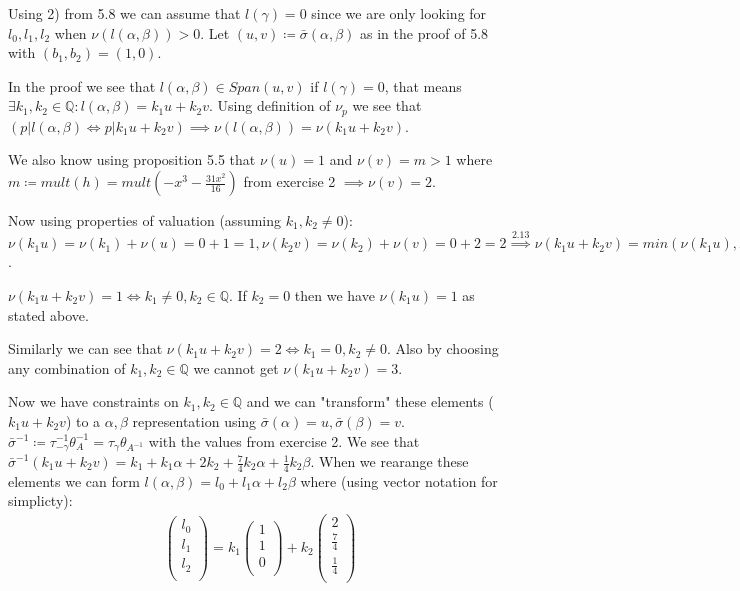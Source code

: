 \documentclass[12pt, a4paper]{article}
\begin{document}
Using 2) from 5.8 we can assume that $l(\gamma)=0$ since we are only looking for $l_0,l_1,l_2$ when $\nu(l(\alpha,\beta))>0$. Let $(u,v) \coloneqq \bar{\sigma}(\alpha,\beta)$ as in the proof of 5.8 with $(b_1,b_2) = (1,0)$. 

In the proof we see that $l(\alpha,\beta) \in Span(u,v)$ if $l(\gamma)=0$, that means $\exists k_1,k_2 \in \mathbb{Q}: l(\alpha, \beta) = k_1u + k_2v$. Using definition of $\nu_p$ we see that $(p | l(\alpha,\beta) \iff p| k_1u+k_2v) \implies \nu(l(\alpha, \beta))=\nu(k_1u+k_2v)$. 

We also know using proposition 5.5 that $\nu(u)=1$ and $\nu(v)=m>1$ where $m \coloneqq mult(h) = mult(-x^3-\frac{31 x^2}{16})$ from exercise 2 $\implies \nu(v)=2$.

Now using properties of valuation (assuming $k_1,k_2 \neq 0$): $\nu(k_1u)=\nu(k_1)+\nu(u) = 0 + 1 = 1, \nu(k_2v)=\nu(k_2)+\nu(v) = 0 + 2 = 2 \stackrel{2.13}{\implies} \nu(k_1u+k_2v) = min(\nu(k_1u),\nu(k_2v)) = min(1,2) = 1$.

$\nu(k_1u+k_2v) = 1 \iff k_1 \neq 0, k_2 \in \mathbb{Q}$. If $k_2=0$ then we have $\nu(k_1u)=1$ as stated above.

Similarly we can see that $\nu(k_1u+k_2v) = 2 \iff k_1 = 0, k_2 \neq 0$. Also by choosing any combination of $k_1,k_2 \in \mathbb{Q}$ we cannot get $\nu(k_1u+k_2v) = 3$.

Now we have constraints on $k_1,k_2 \in \mathbb{Q}$ and we can "transform" these elements ($k_1u+k_2v$) to a $\alpha, \beta$ representation using $\bar{\sigma}(\alpha)=u, \bar{\sigma}(\beta)=v$. $\bar{\sigma}^{-1} \coloneqq \tau^{-1}_{-\gamma} \theta^{-1}_{A} = \tau_{\gamma}\theta_{A^{-1}}$ with the values from exercise 2. We see that $\bar{\sigma}^{-1}(k_1u+k_2v) = k_1+k_1\alpha+2k_2+\frac{7}{4}k_2\alpha + \frac{1}{4}k_2\beta $. When we rearange these elements we can form $l(\alpha,\beta) = l_0 + l_1\alpha + l_2\beta$ where (using vector notation for simplicty):
\begin{gather*}
\begin{pmatrix}
l_0\\
l_1\\
l_2\\
\end{pmatrix} = k_1\begin{pmatrix}
1\\
1\\
0\\
\end{pmatrix} + k_2\begin{pmatrix}
2\\
\frac{7}{4}\\
\frac{1}{4}\\
\end{pmatrix}
\end{gather*}
\end{document}
